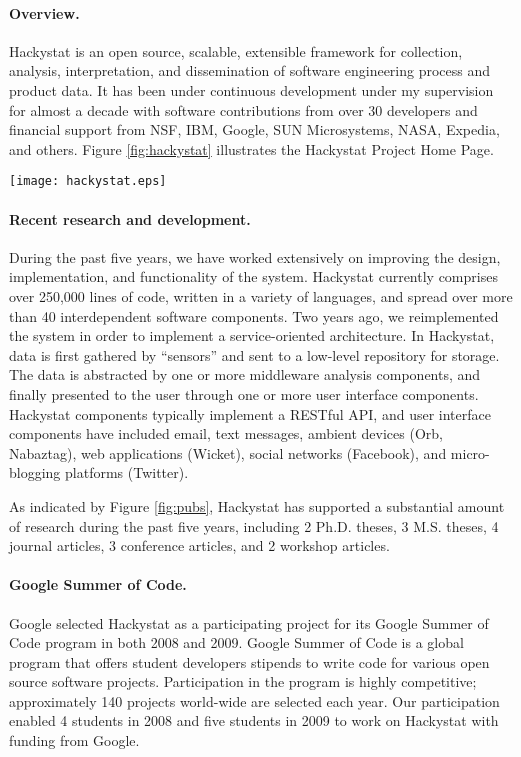 \documentclass[11pt]{article}
\begin{document}
\paragraph{Overview.} Hackystat is an open source, scalable, extensible framework for collection,
analysis, interpretation, and dissemination of software engineering process
and product data.  It has been under continuous development under my
supervision for almost a decade with software contributions from over 30
developers and financial support from NSF, IBM, Google, SUN Microsystems,
NASA, Expedia, and others.  Figure \ref{fig:hackystat} illustrates the
Hackystat Project Home Page.


\begin{figure*}[ht]
  \center
  \texttt{[image: hackystat.eps]}
  \caption{The Hackystat Project Home Page}
  \label{fig:hackystat}
\end{figure*} 

\paragraph{Recent research and development.} During the past five years, we
have worked extensively on improving the design, implementation, and
functionality of the system.  Hackystat currently comprises over 250,000
lines of code, written in a variety of languages, and spread over more than
40 interdependent software components.  Two years ago, we reimplemented the
system in order to implement a service-oriented architecture.  In
Hackystat, data is first gathered by ``sensors'' and sent to a low-level
repository for storage.  The data is abstracted by one or more middleware
analysis components, and finally presented to the user through one or more
user interface components.  Hackystat components typically implement a
RESTful API, and user interface components have included email, text
messages, ambient devices (Orb, Nabaztag), web applications (Wicket),
social networks (Facebook), and micro-blogging platforms (Twitter).

As indicated by Figure \ref{fig:pubs}, Hackystat has supported a
substantial amount of research during the past five years, including 2
Ph.D. theses, 3 M.S. theses, 4 journal articles, 3 conference articles, and
2 workshop articles.

\paragraph{Google Summer of Code.} Google selected Hackystat as a
participating project for its Google Summer of Code program in both 2008
and 2009.  Google Summer of Code is a global program that offers student
developers stipends to write code for various open source software
projects.  Participation in the program is highly competitive;
approximately 140 projects world-wide are selected each year.  Our
participation enabled 4 students in 2008 and five students in 2009 to work
on Hackystat with funding from Google.



\end{document}
